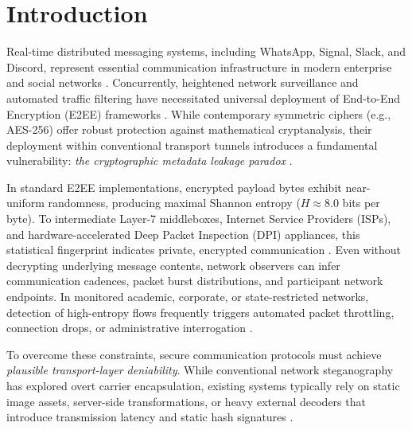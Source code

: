 \documentclass[conference]{IEEEtran}
\begin{document}
\section{Introduction}
Real-time distributed messaging systems, including WhatsApp, Signal, Slack, and Discord, represent essential communication infrastructure in modern enterprise and social networks \cite{rescorla2018tls}. Concurrently, heightened network surveillance and automated traffic filtering have necessitated universal deployment of End-to-End Encryption (E2EE) frameworks \cite{perrin2016double}. While contemporary symmetric ciphers (e.g., AES-256) offer robust protection against mathematical cryptanalysis, their deployment within conventional transport tunnels introduces a fundamental vulnerability: \textit{the cryptographic metadata leakage paradox} \cite{backes2019cryptographic}.

In standard E2EE implementations, encrypted payload bytes exhibit near-uniform randomness, producing maximal Shannon entropy ($H \approx 8.0$ bits per byte). To intermediate Layer-7 middleboxes, Internet Service Providers (ISPs), and hardware-accelerated Deep Packet Inspection (DPI) appliances, this statistical fingerprint indicates private, encrypted communication \cite{provos2003hide}. Even without decrypting underlying message contents, network observers can infer communication cadences, packet burst distributions, and participant network endpoints. In monitored academic, corporate, or state-restricted networks, detection of high-entropy flows frequently triggers automated packet throttling, connection drops, or administrative interrogation \cite{winter2012great}.

To overcome these constraints, secure communication protocols must achieve \textit{plausible transport-layer deniability}. While conventional network steganography has explored overt carrier encapsulation, existing systems typically rely on static image assets, server-side transformations, or heavy external decoders that introduce transmission latency and static hash signatures \cite{westfeld1999attacks}.
\end{document}

